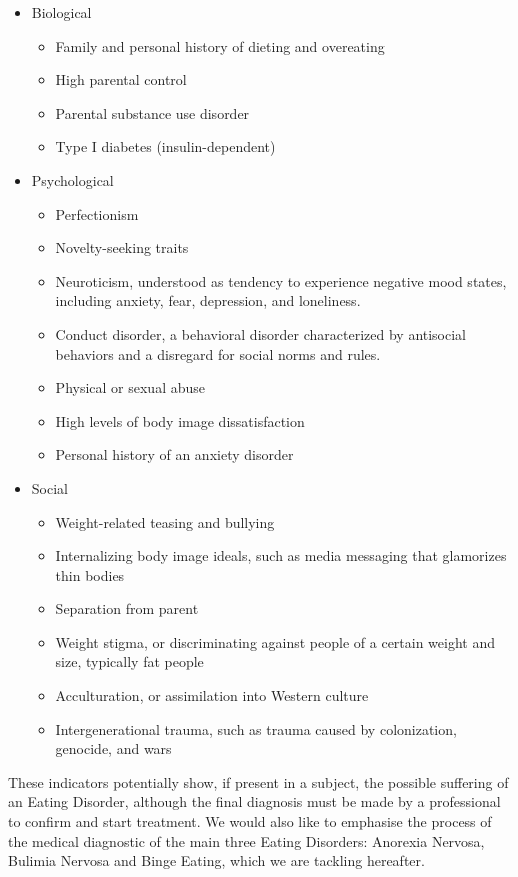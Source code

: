 \begin{itemize}
    \item Biological
    \begin{itemize}
        \item Family and personal history of dieting and overeating
        \item High parental control
        \item Parental substance use disorder
        \item Type I diabetes (insulin-dependent)
    \end{itemize}
    \item Psychological 
    \begin{itemize}
        \item Perfectionism
        \item Novelty-seeking traits 
        \item Neuroticism, understood as tendency to experience negative mood states, including anxiety, fear, depression, and loneliness.
        \item Conduct disorder, a behavioral disorder characterized by antisocial behaviors and a disregard for social norms and rules.
        \item Physical or sexual abuse
        \item High levels of body image dissatisfaction
        \item Personal history of an anxiety disorder
    \end{itemize}
    \item Social
    \begin{itemize}
        \item Weight-related teasing and bullying
        \item Internalizing body image ideals, such as media messaging that glamorizes thin bodies
        \item Separation from parent
        \item Weight stigma, or discriminating against people of a certain weight and size, typically fat people 
        \item Acculturation, or assimilation into Western culture
        \item Intergenerational trauma, such as trauma caused by colonization, genocide, and wars
    \end{itemize}
\end{itemize}

These indicators potentially show, if present in a subject, the possible suffering of an Eating Disorder, although the final diagnosis must be made by a professional to confirm and start treatment. We would also like to emphasise the process of the medical diagnostic of the main three Eating Disorders: Anorexia Nervosa, Bulimia Nervosa and Binge Eating, which we are tackling hereafter.

